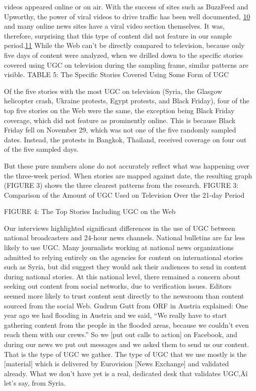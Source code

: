 \documentclass[symmetric, notoc, nobib]{towcenter-book}
\begin{document}
videos appeared online or on air. With the success of sites such as BuzzFeed
and Upworthy, the power of viral videos to drive traffic has been well documented,
{\href{#endnotes}{10}} and many online news sites have a viral video section themselves.
It was, therefore, surprising that this type of content did not feature in our
sample period.{\href{#endnotes}{11}}
While the Web can't be directly compared to television, because only five
days of content were analyzed, when we drilled down to the specific stories
covered using UGC on television during the sampling frame, similar patterns
are visible.
TABLE 5: The Specific Stories Covered Using Some Form of UGC

Of the five stories with the most UGC on television (Syria, the Glasgow
helicopter crash, Ukraine protests, Egypt protests, and Black Friday), four of
the top five stories on the Web were the same, the exception being Black Friday
coverage, which did not feature as prominently online. This is because
Black Friday fell on November 29, which was not one of the five randomly
sampled dates. Instead, the protests in Bangkok, Thailand, received coverage
on four out of the five sampled days.

But these pure numbers alone do not accurately reflect what was happening
over the three-week period. When stories are mapped against date,
the resulting graph (FIGURE 3) shows the three clearest patterns from the
research.
FIGURE 3: Comparison of the Amount of UGC Used on Television Over the 21-day Period

FIGURE 4: The Top Stories Including UGC on the Web

Our interviews highlighted significant differences in the use of UGC
between national broadcasters and 24-hour news channels. National bulletins
are far less likely to use UGC. Many journalists working at national
news organizations admitted to relying entirely on the agencies for content
on international stories such as Syria, but did suggest they would ask their
audiences to send in content during national stories. At this national level,
there remained a concern about seeking out content from social networks,
due to verification issues. Editors seemed more likely to trust content
sent directly to the newsroom than content sourced from the social Web.
Gudrun Gutt from ORF in Austria explained:
One year ago we had flooding in Austria and we said, ``We really
have to start gathering content from the people in the flooded areas,
because we couldn't even reach them with our crews.'' So we [put out
calls to action] on Facebook, and during our news we put out messages
and we asked them to send us our content. That is the type of
UGC we gather. The type of UGC that we use mostly is the [material]
which is delivered by Eurovision [News Exchange] and validated
already. What we don't have yet is a real, dedicated desk that validates
UGC‚Äî let's say, from Syria.
\end{document}
